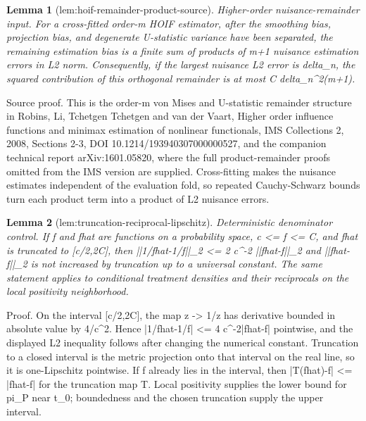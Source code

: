 \documentclass{article}
\newtheorem{lemma}{Lemma}
\begin{document}
\begin{lemma}[lem:hoif-remainder-product-source]\label{lem:hoif-remainder-product-source}
Higher-order nuisance-remainder input. For a cross-fitted order-m HOIF estimator, after the smoothing bias, projection bias, and degenerate U-statistic variance have been separated, the remaining estimation bias is a finite sum of products of m+1 nuisance estimation errors in L2 norm. Consequently, if the largest nuisance L2 error is delta_n, the squared contribution of this orthogonal remainder is at most C delta_n^{2(m+1)}.
\end{lemma}
Source proof. This is the order-m von Mises and U-statistic remainder structure in Robins, Li, Tchetgen Tchetgen and van der Vaart, Higher order influence functions and minimax estimation of nonlinear functionals, IMS Collections 2, 2008, Sections 2-3, DOI 10.1214/193940307000000527, and the companion technical report arXiv:1601.05820, where the full product-remainder proofs omitted from the IMS version are supplied. Cross-fitting makes the nuisance estimates independent of the evaluation fold, so repeated Cauchy-Schwarz bounds turn each product term into a product of L2 nuisance errors.

\begin{lemma}[lem:truncation-reciprocal-lipschitz]\label{lem:truncation-reciprocal-lipschitz}
Deterministic denominator control. If f and fhat are functions on a probability space, c <= f <= C, and fhat is truncated to [c/2,2C], then ||1/fhat-1/f||_2 <= 2 c^{-2} ||fhat-f||_2 and ||fhat-f||_2 is not increased by truncation up to a universal constant. The same statement applies to conditional treatment densities and their reciprocals on the local positivity neighborhood.
\end{lemma}
Proof. On the interval [c/2,2C], the map z -> 1/z has derivative bounded in absolute value by 4/c^2. Hence |1/fhat-1/f| <= 4 c^{-2}|fhat-f| pointwise, and the displayed L2 inequality follows after changing the numerical constant. Truncation to a closed interval is the metric projection onto that interval on the real line, so it is one-Lipschitz pointwise. If f already lies in the interval, then |T(fhat)-f| <= |fhat-f| for the truncation map T. Local positivity supplies the lower bound for pi_P near t_0; boundedness and the chosen truncation supply the upper interval.
\end{document}
